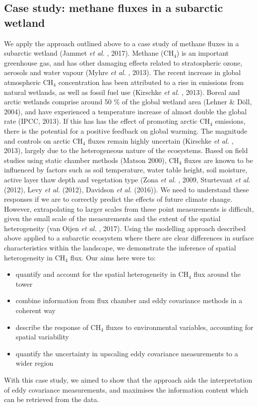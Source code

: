 \subsection{Case study: methane fluxes in a subarctic
wetland}\label{case-study-methane-fluxes-in-a-subarctic-wetland}

We apply the approach outlined above to a case study of methane fluxes
in a subarctic wetland (Jammet \emph{et al.} , 2017). Methane (CH\(_4\))
is an important greenhouse gas, and has other damaging effects related
to stratospheric ozone, aerosols and water vapour (Myhre \emph{et al.} ,
2013). The recent increase in global atmospheric CH\(_4\) concentration
has been attributed to a rise in emissions from natural wetlands, as
well as fossil fuel use (Kirschke \emph{et al.} , 2013). Boreal and
arctic wetlands comprise around 50 \% of the global wetland area (Lehner
\& Döll, 2004), and have experienced a temperature increase of almost
double the global rate (IPCC, 2013). If this has has the effect of
promoting arctic CH\(_4\) emissions, there is the potential for a
positive feedback on global warming. The magnitude and controls on
arctic CH\(_4\) fluxes remain highly uncertain (Kirschke \emph{et al.} ,
2013), largely due to the heterogeneous nature of the ecosystems. Based
on field studies using static chamber methods (Matson 2000), CH\(_4\)
fluxes are known to be influenced by factors such as soil temperature,
water table height, soil moisture, active layer thaw depth and
vegetation type (Zona \emph{et al.} , 2009, Sturtevant \emph{et al.} 
(2012), Levy \emph{et al.} (2012), Davidson \emph{et al.} (2016)). We
need to understand these responses if we are to correctly predict the
effects of future climate change. However, extrapolating to larger
scales from these point measurements is difficult, given the small scale
of the measurements and the extent of the spatial heterogeneity (van
Oijen \emph{et al.} , 2017). Using the modelling approach described above
applied to a subarctic ecosystem where there are clear differences in
surface characteristics within the landscape, we demonstrate the
inference of spatial heterogeneity in CH\(_4\) flux. Our aims here were
to:

\begin{itemize}
\item
  quantify and account for the spatial heterogeneity in CH\(_4\) flux
  around the tower
\item
  combine information from flux chamber and eddy covariance methods in a
  coherent way
\item
  describe the response of CH\(_4\) fluxes to environmental variables,
  accounting for spatial variability\\
\item
  quantify the uncertainty in upscaling eddy covariance measurements to
  a wider region

\end{itemize}

With this case study, we aimed to show that the approach aids the
interpretation of eddy covariance measurements, and maximises the
information content which can be retrieved from the data.